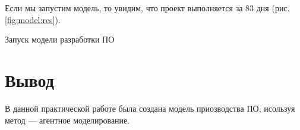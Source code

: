 Если мы запустим модель, то увидим, что проект
выполняется за 83 дня (рис. \ref{fig:model:res}).

\begin{image}
	\caption{Запуск модели разработки ПО}
	\label{fig:model:res}
\end{image}

\clearpage

\section*{\LARGE Вывод}
В данной практической работе была создана модель приозводства ПО,
исользуя метод --- агентное моделирование.

